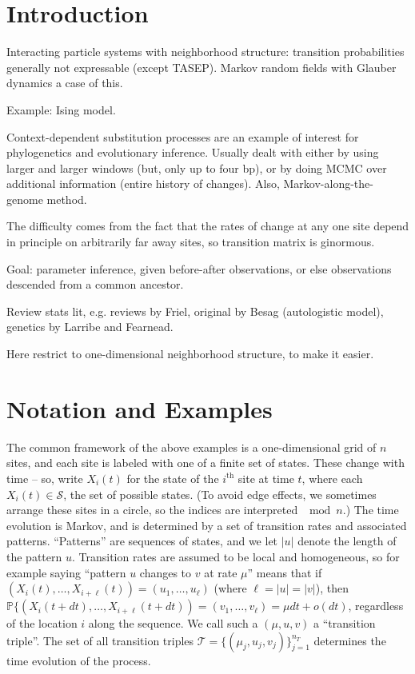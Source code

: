 \documentclass{article}
\renewcommand{\P}{\mathbb{P}}
\newcommand{\calS}{\mathcal{S}}  %
\newcommand{\calT}{\mathcal{T}}  %
\theoremstyle{plain}
\theoremstyle{definition}
\begin{document}
\section*{Introduction}

Interacting particle systems with neighborhood structure: transition probabilities generally not expressable (except TASEP).
Markov random fields with Glauber dynamics a case of this.

Example: Ising model.

Context-dependent substitution processes are an example of interest for phylogenetics and evolutionary inference.
Usually dealt with either by using larger and larger windows (but, only up to four bp),
or by doing MCMC over additional information (entire history of changes).
Also, Markov-along-the-genome method.

The difficulty comes from the fact that the rates of change at any one site depend in principle on arbitrarily far away sites,
so transition matrix is ginormous.

Goal: parameter inference, given before-after observations, or else observations descended from a common ancestor.

Review stats lit, e.g. reviews by Friel, original by Besag (autologistic model), genetics by Larribe and Fearnead.

Here restrict to one-dimensional neighborhood structure,
to make it easier.

\section{Notation and Examples}

The common framework of the above examples is a one-dimensional grid of $n$ sites,
and each site is labeled with one of a finite set of states.
These change with time -- so, write $X_i(t)$ for the state of the $i^\mathrm{th}$ site at time $t$,
where each $X_i(t) \in \calS$, the set of possible states.
(To avoid edge effects, we sometimes arrange these sites in a circle, so the indices are interpreted $\mod n$.)
The time evolution is Markov, and is determined by a set of transition rates and associated patterns.  
``Patterns'' are sequences of states, and we let $|u|$ denote the length of the pattern $u$.
Transition rates are assumed to be local and homogeneous, so for example saying ``pattern $u$ changes to $v$ at rate $\mu$''
means that if $(X_i(t), \ldots, X_{i+\ell}(t)) = (u_1, \ldots, u_\ell)$ (where $\ell=|u|=|v|$),
then $\P\{(X_i(t+dt), \ldots, X_{i+\ell}(t+dt)) = (v_1, \ldots, v_\ell) = \mu dt + o(dt)$,
regardless of the location $i$ along the sequence.
We call such a $(\mu,u,v)$ a ``transition triple''.
The set of all transition triples $\calT = \{ (\mu_j,u_j,v_j) \}_{j=1}^{n_T}$ 
determines the time evolution of the process.
\end{document}
